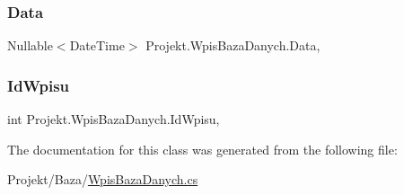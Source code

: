 \subsubsection{\texorpdfstring{Data}{Data}}
{\footnotesize\ttfamily Nullable$<$Date\+Time$>$ Projekt.\+Wpis\+Baza\+Danych.\+Data\hspace{0.3cm}{\ttfamily [get]}, {\ttfamily [set]}}

\mbox{\label{class_projekt_1_1_wpis_baza_danych_a557fe384cf9d048abd0ca03a212c93f8}} 
\subsubsection{\texorpdfstring{IdWpisu}{IdWpisu}}
{\footnotesize\ttfamily int Projekt.\+Wpis\+Baza\+Danych.\+Id\+Wpisu\hspace{0.3cm}{\ttfamily [get]}, {\ttfamily [set]}}



The documentation for this class was generated from the following file\+:\begin{DoxyCompactItemize}
\item 
Projekt/\+Baza/\mbox{\hyperlink{_wpis_baza_danych_8cs}{Wpis\+Baza\+Danych.\+cs}}\end{DoxyCompactItemize}
